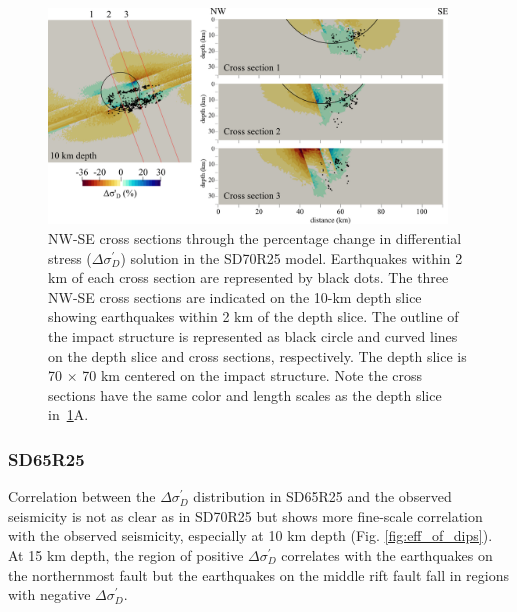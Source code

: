 \documentclass[draft]{agujournal2018}
\begin{document}
\begin{figure}[ht]
\centering
\includegraphics[width=25pc]{Figures/SD70R25_profiles.png}
\caption{NW-SE cross sections through the percentage change in differential stress ($\Delta\sigma_{D}^{\prime}$) solution in the SD70R25 model. Earthquakes within 2 km of each cross section are represented by black dots. The three NW-SE cross sections are indicated on the 10-km depth slice showing earthquakes within 2 km of the depth slice. The outline of the impact structure is represented as black circle and curved lines on the depth slice and cross sections, respectively. The depth slice is 70 $\times$ 70 km centered on the impact structure. Note the cross sections have the same color and length scales as the depth slice in~\ref{fig:profiles_70_70_70_2km}A.}
\label{fig:profiles_70_70_70_2km}
\end{figure}


\subsubsection{SD65R25}
Correlation between the $\Delta\sigma_{D}^{\prime}$ distribution in SD65R25 and the observed seismicity is not as clear as in SD70R25 but shows more fine-scale correlation with the observed seismicity, especially at 10 km depth (Fig. \ref{fig:eff_of_dips}). At 15 km depth, the region of positive $\Delta\sigma_{D}^{\prime}$ correlates with the earthquakes on the northernmost fault but the earthquakes on the middle rift fault fall in regions with negative $\Delta\sigma_{D}^{\prime}$. 
\end{document}
